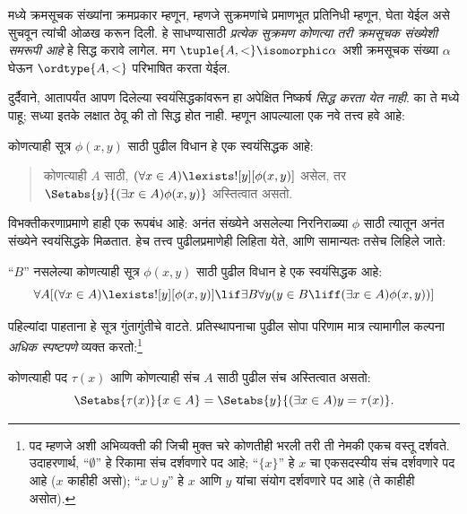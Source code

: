 \documentclass[../../../include/open-logic-section]{subfiles}
\begin{document}

 मध्ये क्रमसूचक संख्यांना क्रमप्रकार म्हणून, म्हणजे सुक्रमणांचे प्रमाणभूत प्रतिनिधी म्हणून, घेता येईल असे सुचवून त्यांची ओळख करून दिली. हे साधण्यासाठी \emph{प्रत्येक सुक्रमण कोणत्या तरी क्रमसूचक संख्येशी समरूपी आहे} हे सिद्ध करावे लागेल. मग $\tuple{A, <} \isomorphic \alpha$ अशी क्रमसूचक संख्या $\alpha$ घेऊन $\ordtype{A, <}$ परिभाषित करता येईल.

दुर्दैवाने, आतापर्यंत आपण दिलेल्या स्वयंसिद्धकांवरून हा अपेक्षित निष्कर्ष \emph{सिद्ध करता येत नाही}. का ते  मध्ये पाहू; सध्या इतके लक्षात ठेवू की तो सिद्ध होत नाही. म्हणून आपल्याला एक नवे तत्त्व हवे आहे:

\begin{axiom}[प्रतिस्थापन-रूपबंध]
कोणत्याही सूत्र $\phi(x, y)$ साठी पुढील विधान हे एक स्वयंसिद्धक आहे:
\begin{quote}
	कोणत्याही $A$ साठी, $(\forall x \in A)\lexists![y][\phi(x,y)]$ असेल, तर $\Setabs{y}{(\exists x \in A)\phi(x,y)}$ अस्तित्वात असतो.
\end{quote}
\end{axiom}
\noindent
विभक्तीकरणाप्रमाणे हाही एक रूपबंध आहे: अनंत संख्येने असलेल्या निरनिराळ्या $\phi$ साठी त्यातून अनंत संख्येने स्वयंसिद्धके मिळतात. हेच तत्त्व पुढीलप्रमाणेही लिहिता येते, आणि सामान्यतः तसेच लिहिले जाते:

\begin{defish}
``$B$'' नसलेल्या कोणत्याही सूत्र $\phi(x,y)$ साठी पुढील विधान हे एक स्वयंसिद्धक आहे:
\[
\forall A[(\forall x \in A)\lexists![y][\phi(x,y)] \lif \exists B\forall y (y \in B \liff (\exists x \in A)\phi(x,y))]
\]
\end{defish}

पहिल्यांदा पाहताना हे सूत्र गुंतागुंतीचे वाटते. प्रतिस्थापनाचा पुढील सोपा परिणाम मात्र त्यामागील कल्पना \emph{अधिक स्पष्टपणे} व्यक्त करतो:\footnote{पद म्हणजे अशी अभिव्यक्ती की जिची मुक्त चरे कोणतीही भरली तरी ती नेमकी एकच वस्तू दर्शवते. उदाहरणार्थ, ``$\emptyset$'' हे रिकामा संच दर्शवणारे पद आहे; ``$\{x\}$'' हे $x$ चा एकसदस्यीय संच दर्शवणारे पद आहे ($x$ काहीही असो); ``$x \cup y$'' हे $x$ आणि $y$ यांचा संयोग दर्शवणारे पद आहे (ते काहीही असोत).}

\begin{cor}
कोणत्याही पद $\tau(x)$ आणि कोणत्याही संच $A$ साठी पुढील संच अस्तित्वात असतो:
\[
	\Setabs{\tau(x)}{x \in A} = \Setabs{y}{(\exists x \in A)y = \tau(x)}.
\]
\end{cor}
\end{document}

